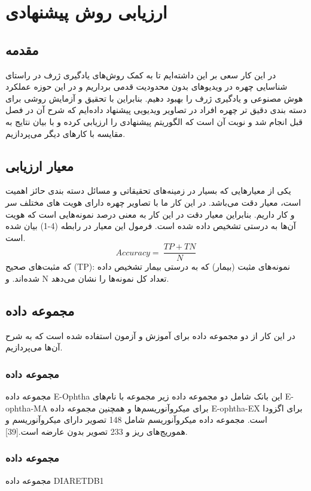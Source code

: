 \chapter{ارزیابی روش پیشنهادی}
\section{مقدمه}

در این کار سعی بر این داشته‌ایم تا به کمک روش‌های یادگیری ژرف در راستای شناسایی چهره در ویدیوهای بدون محدودیت قدمی برداریم و در این حوزه عملکرد هوش مصنوعی و یادگیری ژرف را بهبود دهیم. بنابراین با تحقیق و آزمایش روشی برای دسته بندی دقیق تر چهره افراد در تصاویر ویدیویی پیشنهاد داده‌ایم که شرح آن در فصل قبل انجام شد و نوبت آن است که الگوریتم پیشنهادی را ارزیابی کرده و با بیان نتایج به مقایسه با کارهای دیگر می‌پردازیم.
\section{معیار ارزیابی}

یکی از معیارهایی که بسیار در زمینه‌های تحقیقاتی و مسائل دسته بندی حائز اهمیت است، معیار دقت می‌باشد. در این کار ما با تصاویر چهره دارای هویت های مختلف سر و کار داریم. بنابراین معیار دقت در این کار به معنی درصد نمونه‌هایی است که هویت آن‌ها به درستی تشخیص داده شده است. فرمول این معیار در رابطه (4-1) بیان شده است.
\begin{equation}\label{eq3-1}
Accuracy=\ \frac{TP+TN}{N}
\end{equation}
که 	مثبت‌های صحیح  (TP): نمونه‌های مثبت (بیمار) که به درستی بیمار تشخیص داده شده‌اند. و N تعداد کل نمونه‌ها را نشان می‌دهد.
‌
\section{مجموعه داده}
در این کار از دو مجموعه داده برای آموزش و آزمون استفاده شده است که به شرح آن‌ها می‌پردازیم.
\subsection{مجموعه داده}
مجموعه داده E-Ophtha
این بانک شامل دو مجموعه داده زیر مجموعه با نام‌های E-ophtha-MA برای میکروآنوریسم‌ها و همچنین مجموعه داده E-ophtha-EX برای اگزودا است. مجموعه داده میکروآنوریسم شامل 148 تصویر دارای میکروآنوریسم و هموریج‌های ریز و 233 تصویر بدون عارضه است.[39].
\subsection{مجموعه داده}
مجموعه داده DIARETDB1

